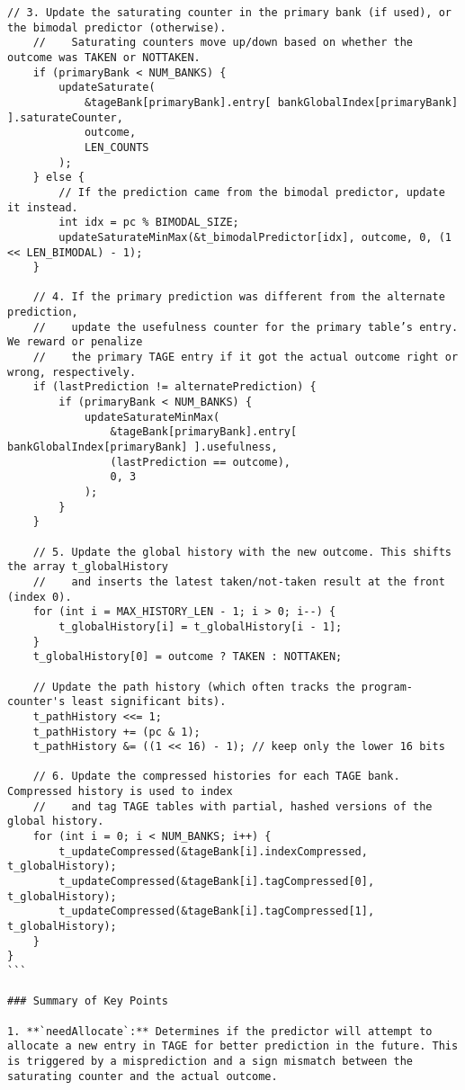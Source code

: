 \documentclass[sigconf, screen]{acmart}
\begin{document}
\begin{Verbatim}[fontsize=\tiny, breaklines=true]
    // 3. Update the saturating counter in the primary bank (if used), or the bimodal predictor (otherwise).
    //    Saturating counters move up/down based on whether the outcome was TAKEN or NOTTAKEN.
    if (primaryBank < NUM_BANKS) {
        updateSaturate(
            &tageBank[primaryBank].entry[ bankGlobalIndex[primaryBank] ].saturateCounter,
            outcome,
            LEN_COUNTS
        );
    } else {
        // If the prediction came from the bimodal predictor, update it instead.
        int idx = pc % BIMODAL_SIZE;
        updateSaturateMinMax(&t_bimodalPredictor[idx], outcome, 0, (1 << LEN_BIMODAL) - 1);
    }

    // 4. If the primary prediction was different from the alternate prediction,
    //    update the usefulness counter for the primary table’s entry. We reward or penalize
    //    the primary TAGE entry if it got the actual outcome right or wrong, respectively.
    if (lastPrediction != alternatePrediction) {
        if (primaryBank < NUM_BANKS) {
            updateSaturateMinMax(
                &tageBank[primaryBank].entry[ bankGlobalIndex[primaryBank] ].usefulness,
                (lastPrediction == outcome),
                0, 3
            );
        }
    }

    // 5. Update the global history with the new outcome. This shifts the array t_globalHistory
    //    and inserts the latest taken/not-taken result at the front (index 0).
    for (int i = MAX_HISTORY_LEN - 1; i > 0; i--) {
        t_globalHistory[i] = t_globalHistory[i - 1];
    }
    t_globalHistory[0] = outcome ? TAKEN : NOTTAKEN;

    // Update the path history (which often tracks the program-counter's least significant bits).
    t_pathHistory <<= 1;
    t_pathHistory += (pc & 1);
    t_pathHistory &= ((1 << 16) - 1); // keep only the lower 16 bits

    // 6. Update the compressed histories for each TAGE bank. Compressed history is used to index
    //    and tag TAGE tables with partial, hashed versions of the global history.
    for (int i = 0; i < NUM_BANKS; i++) {
        t_updateCompressed(&tageBank[i].indexCompressed, t_globalHistory);
        t_updateCompressed(&tageBank[i].tagCompressed[0], t_globalHistory);
        t_updateCompressed(&tageBank[i].tagCompressed[1], t_globalHistory);
    }
}
```

### Summary of Key Points

1. **`needAllocate`:** Determines if the predictor will attempt to allocate a new entry in TAGE for better prediction in the future. This is triggered by a misprediction and a sign mismatch between the saturating counter and the actual outcome.


\end{Verbatim}
\end{document}
